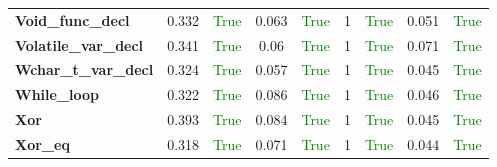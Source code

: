 \documentclass{article}
\begin{document}
\begin{xltabular}{\textwidth}{lcccccccc}
\textbf{{\fontsize{10}{12}\selectfont Void\_func\_decl}}& 0.332&\textcolor{green}{True}& 0.063&\textcolor{green}{True}& 1&\textcolor{green}{True}& 0.051&\textcolor{green}{True} \\[0.5ex]
\textbf{{\fontsize{10}{12}\selectfont Volatile\_var\_decl}}& 0.341&\textcolor{green}{True}& 0.06&\textcolor{green}{True}& 1&\textcolor{green}{True}& 0.071&\textcolor{green}{True} \\[0.5ex]
\textbf{{\fontsize{10}{12}\selectfont Wchar\_t\_var\_decl}}& 0.324&\textcolor{green}{True}& 0.057&\textcolor{green}{True}& 1&\textcolor{green}{True}& 0.045&\textcolor{green}{True} \\[0.5ex]
\textbf{{\fontsize{10}{12}\selectfont While\_loop}}& 0.322&\textcolor{green}{True}& 0.086&\textcolor{green}{True}& 1&\textcolor{green}{True}& 0.046&\textcolor{green}{True} \\[0.5ex]
\textbf{{\fontsize{10}{12}\selectfont Xor}}& 0.393&\textcolor{green}{True}& 0.084&\textcolor{green}{True}& 1&\textcolor{green}{True}& 0.045&\textcolor{green}{True} \\[0.5ex]
\textbf{{\fontsize{10}{12}\selectfont Xor\_eq}}& 0.318&\textcolor{green}{True}& 0.071&\textcolor{green}{True}& 1&\textcolor{green}{True}& 0.044&\textcolor{green}{True} \\[0.5ex]
\bottomrule
\end{xltabular}
\newpage
\end{document}
